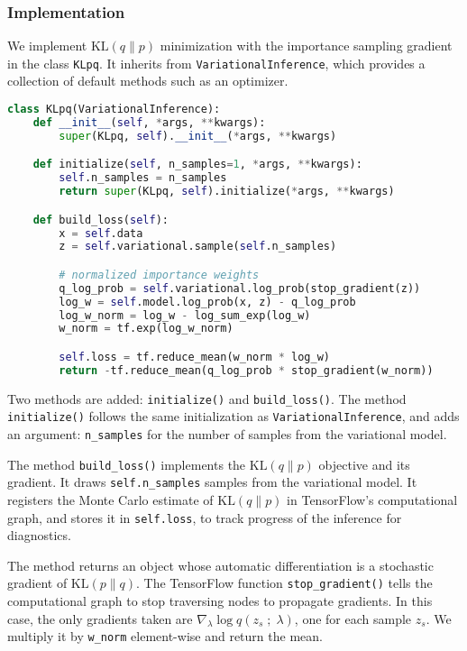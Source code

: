 \subsubsection{Implementation}

We implement $\text{KL}(q\|p)$ minimization with the importance
sampling gradient in the class \texttt{KLpq}. It inherits from
\texttt{VariationalInference}, which provides a collection of default
methods such as an optimizer.

\begin{lstlisting}[language=Python]
class KLpq(VariationalInference):
    def __init__(self, *args, **kwargs):
        super(KLpq, self).__init__(*args, **kwargs)

    def initialize(self, n_samples=1, *args, **kwargs):
        self.n_samples = n_samples
        return super(KLpq, self).initialize(*args, **kwargs)

    def build_loss(self):
        x = self.data
        z = self.variational.sample(self.n_samples)

        # normalized importance weights
        q_log_prob = self.variational.log_prob(stop_gradient(z))
        log_w = self.model.log_prob(x, z) - q_log_prob
        log_w_norm = log_w - log_sum_exp(log_w)
        w_norm = tf.exp(log_w_norm)

        self.loss = tf.reduce_mean(w_norm * log_w)
        return -tf.reduce_mean(q_log_prob * stop_gradient(w_norm))
\end{lstlisting}

Two methods are added: \texttt{initialize()} and
\texttt{build_loss()}. The method \texttt{initialize()}
follows the same initialization as \texttt{VariationalInference}, and
adds an argument: \texttt{n_samples} for the number of samples from
the variational model.

The method \texttt{build_loss()} implements the $\text{KL}(q\|p)$
objective and its gradient. It draws \texttt{self.n_samples} samples from the
variational model. It registers the Monte Carlo
estimate of $\text{KL}(q\|p)$ in TensorFlow's computational graph, and stores it
in \texttt{self.loss}, to track progress of the inference for diagnostics.

The method returns an object whose
automatic differentiation is a stochastic gradient of $\text{KL}(p\|q)$.
The TensorFlow function \texttt{stop_gradient()} tells the computational
graph to stop traversing nodes to propagate gradients. In this case,
the only gradients taken are $\nabla_\lambda \log q(z_s\;;\;\lambda)$,
one for each sample $z_s$. We multiply it by \texttt{w_norm}
element-wise and return the mean.


